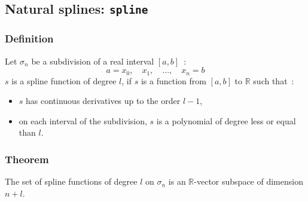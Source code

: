\documentclass[a4paper,11pt]{book}
\begin{document}
\subsection{Natural splines: {\tt spline}}
\subsubsection{Definition}
Let $\sigma_n$ be a subdivision of a real interval $[a,b]$~:
\[ a=x_0,\quad x_1,\quad...,\quad x_n=b \]
$s$ is a spline function of degree $l$, if $s$ is a function from $[a,b]$ 
to $\mathbb R$ such that~:
\begin{itemize}
\item $s$ has continuous derivatives up to the order $l-1$,
\item on each interval of the subdivision, $s$ 
is a polynomial of degree less or equal than $l$.
\end{itemize}

\subsubsection{Theorem}
The set of spline functions of degree $l$ on $\sigma_n$ is an
$\mathbb R$-vector subspace of dimension $n+l$.
\end{document}
